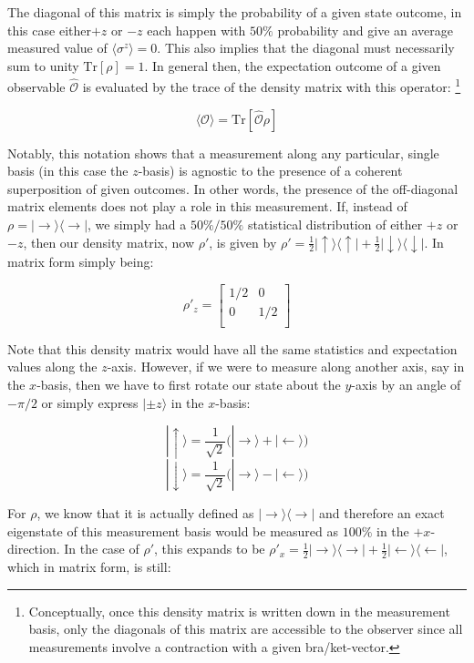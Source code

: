The diagonal of this matrix is simply the probability of a given state outcome, in this case either$+z$ or $-z$ each happen with $50\%$ probability and give an average measured value of $ \langle \sigma^z \rangle =0$. This also implies that the diagonal must necessarily sum to unity $\mathrm{Tr} [\rho]=1$. In general then, the expectation outcome of a given observable $\hat{\mathcal{O}}$ is evaluated by the trace of the density matrix with this operator: \footnote{Conceptually, once this density matrix is written down in the measurement basis, only the diagonals of this matrix are accessible to the observer since all measurements involve a contraction with a given bra/ket-vector.}


\[
\langle \hat{\mathcal{O}} \rangle = \mathrm{Tr} [\hat{\mathcal{O}} \rho]
\]

Notably, this notation shows that a measurement along any particular, single basis (in this case the $z$-basis) is agnostic to the presence of a coherent superposition of given outcomes. In other words, the presence of the off-diagonal matrix elements does not play a role in this measurement. If, instead of $\rho = | \rightarrow \rangle \langle \rightarrow |$, we simply had a  $50\%/50\%$ statistical distribution of either $+z$ or $-z$, then our density matrix, now $\rho'$, is given by $\rho'= \frac{1}{2} | \uparrow \rangle \langle \uparrow | + \frac{1}{2} | \downarrow \rangle \langle \downarrow |$. In matrix form simply being:

\[
\rho'_z =
 \begin{bmatrix}
 1/2 & 0\\
 0 & 1/2 \\
\end{bmatrix}\]

Note that this density matrix would have all the same statistics and expectation values along the $z$-axis. However, if we were to measure along another axis, say in the $x$-basis, then we have to first rotate our state about the $y$-axis by an angle of $-\pi/2$ or simply express $|\pm z\rangle$ in the $x$-basis:

\[
 | \uparrow \rangle = \frac{1}{\sqrt{2}} \Big ( | \rightarrow \rangle + | \leftarrow \rangle \Big )
 \]
 \[
 | \downarrow \rangle = \frac{1}{\sqrt{2}} \Big ( | \rightarrow \rangle - | \leftarrow \rangle \Big )
 \]
 
 For $\rho$, we know that it is actually defined as $| \rightarrow \rangle \langle \rightarrow |$ and therefore an exact eigenstate of this measurement basis would be measured as $100\%$ in the $+x$-direction. In the case of $\rho'$, this expands to be $\rho'_x = \frac{1}{2} | \rightarrow \rangle \langle \rightarrow | + \frac{1}{2} | \leftarrow \rangle \langle \leftarrow |$, which in matrix form, is still:

